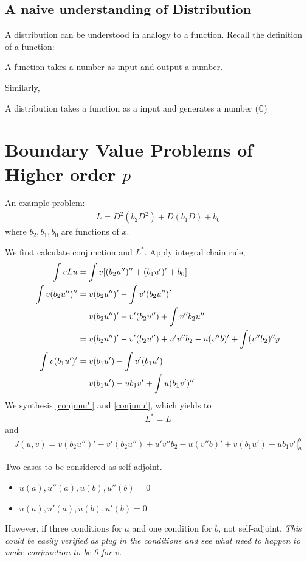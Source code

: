 \documentclass{article}
\numberwithin{equation}{section}
\newcommand{\<}{\langle}
\begin{document}
\subsection{A naive understanding of \textbf{Distribution}}
A distribution can be understood in analogy to a function. Recall the definition of a function:
\begin{tcolorbox}[boxrule = 0pt]
	A function takes a number as input and output a number.
\end{tcolorbox}
Similarly,
\begin{tcolorbox}[boxrule = 0pt]
	A distribution takes a function as a input and generates a number ($\mathbb{C}$)
\end{tcolorbox}

\section{Boundary Value Problems of Higher order $p$}
\begin{tcolorbox}[colback=blue!10!white]
An example problem:
\begin{align}
	L = D^2(b_2 D^2)+ D(b_1 D)+b_0
\end{align}
where $b_2,b_1,b_0$ are functions of $x$.
\end{tcolorbox}
We first calculate conjunction and $L^*$. Apply integral chain rule,
\begin{align}
	\int v L u &= \int v[(b_2 u'')''+(b_1 u')'+ b_0]\notag\\
	\int v(b_2u'')'' &= v(b_2 u'')'-\int v'(b_2u'')'\notag \\
	&=v(b_2 u'')'-v'(b_2u'') +\int v''b_2u'' \notag\\
	&= v(b_2 u'')'-v'(b_2u'')+u'v''b_2-u(v''b)' +\int(v''b_2)''y \label{conjunu''} \\
	\int v(b_1 u')' &= v(b_1u')-\int v'(b_1u')\notag \\
	&=v(b_1u')-ub_1v'+ \int u(b_1v')'' \label{conjunu'}
\end{align}
We synthesis \eqref{conjunu''} and \eqref{conjunu'}, which yields to 
\begin{align}
	L^* = L
\end{align}
and 
\begin{align}
	J(u,v) = v(b_2 u'')'-v'(b_2u'')+u'v''b_2-u(v''b)'+v(b_1u')-ub_1v'|_a^b
\end{align}
\begin{tcolorbox}[colback=red!5!white, boxrule = 0.1pt]
Two cases to be considered as self adjoint.
\begin{itemize}
	\item $u(a),u''(a),u(b),u''(b)=0$ 
	\item $u(a),u'(a),u(b),u'(b)=0$
\end{itemize}
However, if three conditions for $a$ and one condition for $b$, not self-adjoint. \textit{This could be easily verified as plug in the conditions and see what need to happen to make conjunction to be 0 for $v$.}
\end{tcolorbox}
\end{document}
